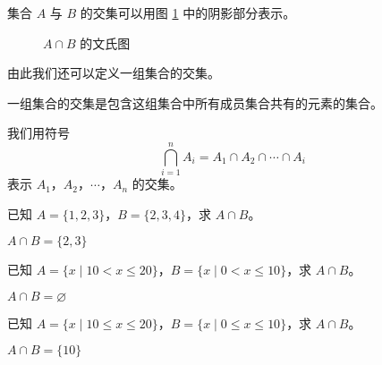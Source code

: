 \documentclass[lang=cn, chinesefont=founder, color=cyan, citestyle=gb7714-2015, bibstyle=gb7714-2015]{elegantbook}
\newcommand{\spare}{\vspace{-1em}\begin{center}\color{structurecolor}\hdashrule[0.5ex]{\textwidth}{1pt}{1pt}\end{center}\vspace{-1em}}
\begin{document}
集合 $A$ 与 $B$ 的交集可以用图 \ref{fig:交集文氏图} 中的阴影部分表示。
\begin{figure}[htbp!]
    \centering
    \caption{$A \cap B$ 的文氏图}
    \label{fig:交集文氏图}
\end{figure}

由此我们还可以定义一组集合的交集。
\begin{definition}[多个集合的交集]\label{def:多个交集}
    一组集合的交集是包含这组集合中所有成员集合共有的元素的集合。
\end{definition}

我们用符号
\begin{equation*}
    \bigcap_{i=1}^n A_i=A_1 \cap A_2 \cap \cdots \cap A_i
\end{equation*}
表示 $A_1$，$A_2$，$\cdots$，$A_n$ 的交集。
\begin{collections}
    \begin{example}
        已知 $A = \{ 1, 2, 3 \}$，$B = \{ 2, 3, 4\}$，求 $A \cap B$。
    \end{example}
    \begin{solution}
        $A \cap B = \{2, 3\}$
    \end{solution}

    \spare

    \begin{example}
        已知 $A = \{ x \mid 10 < x \leq 20 \}$，$B = \{ x \mid 0 < x \leq 10 \}$，求 $A \cap B$。
    \end{example}
    \begin{solution}
        $A \cap B = \varnothing$
    \end{solution}

    \spare

    \begin{example}
        已知 $A = \{ x \mid 10 \leq x \leq 20 \}$，$B = \{ x \mid 0 \leq x \leq 10 \}$，求 $A \cap B$。
    \end{example}
    \begin{solution}
        $A \cap B = \{10\}$
    \end{solution}
\end{collections}
\end{document}
